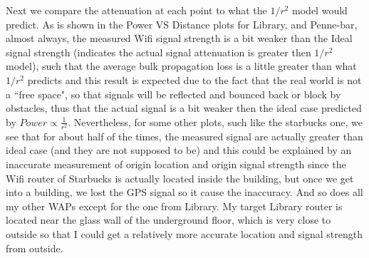 \documentclass[usletter,12pt]{article}
\begin{document}
Next we compare the attenuation at each point to what the $1/r^2$ model would predict. As is shown in the Power VS Distance plots for Library, and Penne-bar, almost always, the measured Wifi signal strength is a bit weaker than the Ideal signal strength (indicates the actual signal attenuation is greater then $1/r^2$ model), such that the average bulk propagation loss is a little greater than what $1/r^2$ predicts and this result is expected due to the fact that the real world is not a ``free space", so that signals will be reflected and bounced back or block by obstacles, thus that the actual signal is a bit weaker then the ideal case predicted by $Power \propto \frac{1}{r^2}$. Nevertheless, for some other plots, such like the starbucks one, we see that for about half of the times, the measured signal are actually greater than ideal case (and they are not supposed to be) and this could be explained by an inaccurate measurement of origin location and origin signal strength since the Wifi router of Starbucks is actually located inside the building, but once we get into a building, we lost the GPS signal so it cause the inaccuracy. And so does all my other WAPs except for the one from Library. My target Library router is located near the glass wall of the underground floor, which is very close to outside so that I could get a relatively more accurate location and signal strength from outside.
\\\\
\end{document}
